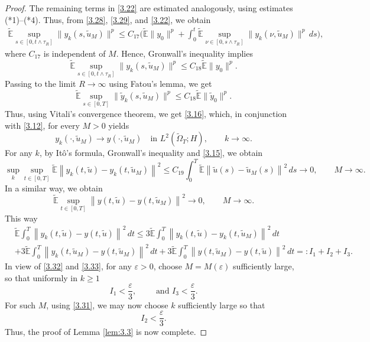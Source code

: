 \documentclass[a4paper,12pt]{article}
\numberwithin{equation}{section}
\begin{document}
\begin{proof}
The remaining terms in \eqref{3.22} are estimated analogously,
using estimates \textnormal{(*1)--(*4)}. Thus, from
\eqref{3.28}, \eqref{3.29}, and \eqref{3.22}, we obtain
\[
\begin{aligned}
\widetilde{\mathbb{E}}
\sup_{s\in[0,t\wedge\tau_R]}
\|{y}_k(s,\widetilde{u}_M)\|^p
\leq
C_{17}
\Biggl(
\widetilde{\mathbb{E}}\|{y}_0\|^p
+
\int_0^t
\widetilde{\mathbb{E}}
\sup_{\nu\in[0,s\wedge\tau_R]}
\|{y}_k(\nu,\widetilde{u}_M)\|^p\,ds
\Biggr),
\end{aligned}
\]
where $C_{17}$ is independent of $M$. Hence, Gronwall's inequality implies
\[
\widetilde{\mathbb{E}}
\sup_{s\in[0,t\wedge\tau_R]}
\|{y}_k(s,\widetilde{u}_M)\|^p
\leq
C_{18}\widetilde{\mathbb{E}}\|{y}_0\|^p.
\]
Passing to the limit $R \to \infty$ using Fatou's lemma, we get 
\begin{equation}
\widetilde{\mathbb{E}}
\sup_{s\in[0,T]}
\|\widetilde{y}_k(s,\widetilde{u}_M)\|^p
\leq
C_{18}\widetilde{\mathbb{E}}\|\widetilde{y}_0\|^p.
\label{3.30}
\end{equation}
Thus, using Vitali's convergence theorem, we get \eqref{3.16}, which, in conjunction with \eqref{3.12}, for every $M>0$ yields 
\begin{equation}
{y}_k(\cdot,\widetilde{u}_M)
\longrightarrow
{y}(\cdot,\widetilde{u}_M)
\quad\text{in }L^2(\widetilde{\Omega}_T;H),
\qquad k\to\infty.
\label{3.31}
\end{equation}
For any $k$, by Itô's formula, Gronwall's inequality and \eqref{3.15}, we obtain
\begin{equation}
\sup_k \sup_{t\in[0,T]}
\widetilde{\mathbb{E}} \left\|
{y}_k(t,\widetilde{u})
-
{y}_k(t,\widetilde{u}_M)
\right\|^2
\leq
C_{19}
\int_0^T
\widetilde{\mathbb{E}}
\left\|
\widetilde{u}(s)-\widetilde{u}_M(s)
\right\|^2\,ds
\to 0,
\qquad M\to\infty.
\label{3.32}
\end{equation}
In a similar way, we obtain
\begin{equation}
\widetilde{\mathbb{E}}
\sup_{t\in[0,T]}
\left\|
{y}(t,\widetilde{u})
-
{y}(t,\widetilde{u}_M)
\right\|^2
\to 0,
\qquad M\to\infty.
\label{3.33}
\end{equation}
This way
\begin{align}
& \widetilde{\mathbb{E}}
\int_0^T
\left\|
{y}_k(t,\widetilde{u})
-
{y}(t,\widetilde{u})
\right\|^2\,dt
\leq
3\widetilde{\mathbb{E}}
\int_0^T
\left\|
{y}_k(t,\widetilde{u})
-
{y}_k(t,\widetilde{u}_M)
\right\|^2\,dt
\nonumber\\
&+
3\widetilde{\mathbb{E}}
\int_0^T
\left\|
{y}_k(t,\widetilde{u}_M)
-
{y}(t,\widetilde{u}_M)
\right\|^2\,dt
\nonumber +
3\widetilde{\mathbb{E}}
\int_0^T
\left\|
{y}(t,\widetilde{u}_M)
-
{y}(t,\widetilde{u})
\right\|^2\,dt
=: I_1+I_2+I_3.
\label{3.34}
\end{align}
In view of \eqref{3.32} and \eqref{3.33}, for any $\varepsilon>0$, choose $M=M(\varepsilon)$ sufficiently
large, so that uniformly in $k \geq 1$
\[
I_1<\frac{\varepsilon}{3},
\qquad \text{ and }
I_3<\frac{\varepsilon}{3}.
\]
For such $M$, using \eqref{3.31}, we may now choose
$k$ sufficiently large so that
\[
I_2<\frac{\varepsilon}{3}.
\]
Thus, the proof of Lemma \ref{lem:3.3} is now complete.
\end{proof}
\end{document}
